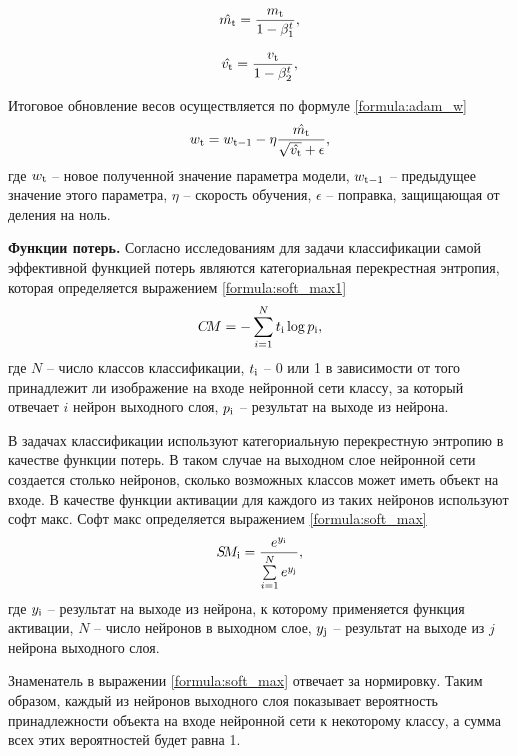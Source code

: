 \begin{equation}\label{formula:adamcorr1}
	\hat{m_{\rm{t}}} = \frac{m_{\rm{t}}}{1 - \beta_{\rm{1}}^t},
\end{equation}

\begin{equation}\label{formula:adamcorr2}
	\hat{v_{\rm{t}}} = \frac{v_{\rm{t}}}{1 - \beta_{\rm{2}}^t},
\end{equation}

Итоговое обновление весов осуществляется по формуле 
\ref{formula:adam_w}
\begin{equation}\label{formula:adam_w}
	w_{\rm{t}} = w_{\rm{t-1}} - \eta\frac{\hat{m_{\rm{t}}}}{\sqrt{\hat{v_{\rm{t}}}} + \epsilon},
\end{equation}
где $w_{\rm{t}}$ -- новое полученной значение параметра модели, $w_{\rm{t-1}}$ -- предыдущее значение этого параметра, $\eta$ -- скорость обучения, $\epsilon$ -- поправка, защищающая от деления на ноль.

\textbf{Функции потерь.}
Согласно исследованиям \cite{loss_function} для задачи классификации самой эффективной функцией потерь являются категориальная перекрестная энтропия, которая определяется выражением \ref{formula:soft_max1}
\begin{equation}\label{formula:soft_max1}
C\!M = - \sum\limits_{i = 1}^{N}t_{\rm{i}}\log{p_{\rm{i}}},
\end{equation}
где $N$ -- число классов классификации, $t_{\rm{i}}$ -- 0 или 1 в зависимости от того принадлежит ли изображение на входе нейронной сети классу, за который отвечает $i$ нейрон выходного слоя, $p_{\rm{i}}$ -- результат на выходе из нейрона.

В задачах классификации используют категориальную перекрестную энтропию в качестве функции потерь. 
В таком случае на выходном слое нейронной сети создается столько нейронов, сколько возможных классов может иметь объект на входе.
В качестве функции активации для каждого из таких нейронов используют софт макс. 
Софт макс определяется выражением \ref{formula:soft_max}
\begin{equation}\label{formula:soft_max}
S\!M_{\rm{i}} = \frac{e^{y_{\rm{i}}}}{\sum\limits_{i = 1}^{N}e^{y_{\rm{j}}}},
\end{equation}
где $y_{\rm{i}}$ -- результат на выходе из нейрона, к которому применяется функция активации, $N$ -- число нейронов в выходном слое, $y_{\rm{j}}$ -- результат на выходе из $j$ нейрона выходного слоя.

Знаменатель в выражении \ref{formula:soft_max} отвечает за нормировку. 
Таким образом, каждый из нейронов выходного слоя показывает вероятность принадлежности объекта на входе нейронной сети к некоторому классу, а сумма всех этих вероятностей будет равна 1.

